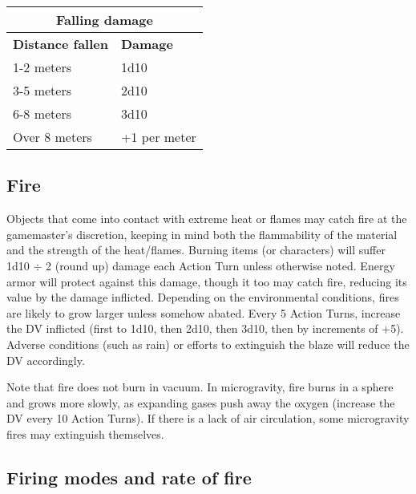 \begin{table} \begin{tabular}{|l|l|} \hline

\multicolumn{2}{|c|}{\textbf{Falling damage}}	\\ \hline

\textbf{Distance fallen}	&\textbf{Damage}	\\ \hline

1-2 meters	&1d10	\\ \hline

3-5 meters	&2d10	\\ \hline

6-8 meters	&3d10	\\ \hline

Over 8 meters	&+1 per meter	\\ \hline

\end{tabular} \label{tab:falling-damage} \end{table} 



\subsection{Fire} \label{sec:fire} 

Objects that come into contact with extreme heat or flames may catch fire at the gamemaster’s discretion, keeping in mind both the flammability of the material and the strength of the heat/flames. Burning items (or characters) will suffer 1d10 $\div$ 2 (round up) damage each Action Turn unless otherwise noted. Energy armor will protect against this damage, though it too may catch fire, reducing its value by the damage inflicted. Depending on the environmental conditions, fires are likely to grow larger unless somehow abated. Every 5 Action Turns, increase the DV inflicted (first to 1d10, then 2d10, then 3d10, then by increments of +5). Adverse conditions (such as rain) or efforts to extinguish the blaze will reduce the DV accordingly. 

Note that fire does not burn in vacuum. In microgravity, fire burns in a sphere and grows more slowly, as expanding gases push away the oxygen (increase the DV every 10 Action Turns). If there is a lack of air circulation, some microgravity fires may extinguish themselves. 



\subsection{Firing modes and rate of fire} \label{sec:firing-modes-rate} 


